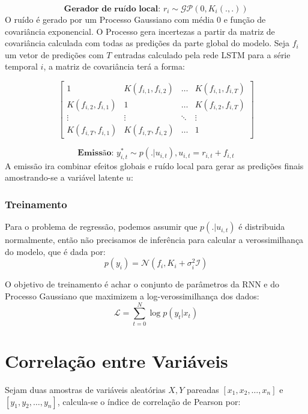 \[
  \textbf{Gerador de ruído local: }  r_i \sim \mathcal{GP} (0, K_i(.,.))
\]
O ruído é gerado por um Processo Gaussiano com média 0 e função de covariância
exponencial. O Processo gera incertezas a partir da matriz de covariância
calculada com todas as predições da parte global do modelo. Seja $f_i$ um vetor
de predições com $T$ entradas calculado pela rede LSTM para a série temporal $i$, a matriz de covariância
terá a forma:  

\[
  \begin{bmatrix}
    1& K(f_{i,1},f_{i,2}) & \dots &K(f_{i,1},f_{i,T}) \\ 
    K(f_{i,2},f_{i,1}) &1  & \dots & K(f_{i,2},f_{i,T})\\ 
    \vdots &  \vdots  & \ddots & \vdots\\
    K(f_{i,T},f_{i,1})& K(f_{i,T},f_{i,2}) & \dots & 1 
  \end{bmatrix} 
\]

\[
  \textbf{Emissão: }  y^*_{i,t} \sim p(. | u_{i,t}) , u_{i,t} = r_{i,t} + f_{i,t}  
\]
A emissão ira combinar efeitos globais e ruído local para gerar as predições
finais amostrando-se a variável latente $u$:
  

\subsubsection{Treinamento}

Para o problema de regressão, podemos assumir que $p(. | u_{i,t})$ é distribuida
normalmente, então não precisamos de inferência para calcular a verossimilhança do modelo, que é dada por: \\

\[
p(y_{i}) = \mathcal{N}(f_i,K_i + \sigma_i^2\mathcal{I})
\]

O objetivo de treinamento é achar o conjunto de parâmetros da RNN e do Processo Gaussiano que maximizem a log-verossimilhança dos dados: \\
\[
\mathcal{L} = \sum_{t=0}^N{\log p(y_t|x_t)}
\]



\section{Correlação entre Variáveis}

Sejam duas amostras de variáveis aleatórias $X,Y$ pareadas $[x_1,x_2, \dots ,
x_n]$ e $[y_1,y_2, \dots , y_n]$, calcula-se o índice de correlação de Pearson por:



